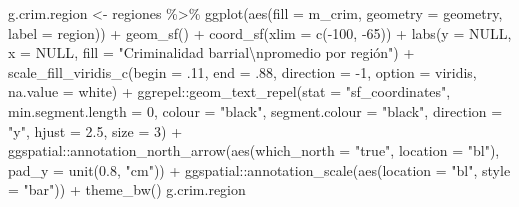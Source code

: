 \documentclass[
  12pt,
]{book}
\newenvironment{Shaded}{\begin{snugshade}}{\end{snugshade}}
\newcommand{\AttributeTok}[1]{\textcolor[rgb]{0.77,0.63,0.00}{#1}}
\newcommand{\ConstantTok}[1]{\textcolor[rgb]{0.00,0.00,0.00}{#1}}
\newcommand{\DecValTok}[1]{\textcolor[rgb]{0.00,0.00,0.81}{#1}}
\newcommand{\FloatTok}[1]{\textcolor[rgb]{0.00,0.00,0.81}{#1}}
\newcommand{\FunctionTok}[1]{\textcolor[rgb]{0.00,0.00,0.00}{#1}}
\newcommand{\NormalTok}[1]{#1}
\newcommand{\OtherTok}[1]{\textcolor[rgb]{0.56,0.35,0.01}{#1}}
\newcommand{\SpecialCharTok}[1]{\textcolor[rgb]{0.00,0.00,0.00}{#1}}
\newcommand{\StringTok}[1]{\textcolor[rgb]{0.31,0.60,0.02}{#1}}
\begin{document}
\begin{Shaded}
\begin{Highlighting}[]
\NormalTok{g.crim.region }\OtherTok{\textless{}{-}}\NormalTok{ regiones }\SpecialCharTok{\%\textgreater{}\%} 
  \FunctionTok{ggplot}\NormalTok{(}\FunctionTok{aes}\NormalTok{(}\AttributeTok{fill =}\NormalTok{ m\_crim, }\AttributeTok{geometry =}\NormalTok{ geometry, }\AttributeTok{label =}\NormalTok{ region)) }\SpecialCharTok{+} 
  \FunctionTok{geom\_sf}\NormalTok{() }\SpecialCharTok{+}
  \FunctionTok{coord\_sf}\NormalTok{(}\AttributeTok{xlim =} \FunctionTok{c}\NormalTok{(}\SpecialCharTok{{-}}\DecValTok{100}\NormalTok{, }\SpecialCharTok{{-}}\DecValTok{65}\NormalTok{)) }\SpecialCharTok{+}
  \FunctionTok{labs}\NormalTok{(}\AttributeTok{y =} \ConstantTok{NULL}\NormalTok{, }\AttributeTok{x =} \ConstantTok{NULL}\NormalTok{, }\AttributeTok{fill =} \StringTok{"Criminalidad barrial}\SpecialCharTok{\textbackslash{}n}\StringTok{promedio por región"}\NormalTok{) }\SpecialCharTok{+}
  \FunctionTok{scale\_fill\_viridis\_c}\NormalTok{(}\AttributeTok{begin =}\NormalTok{ .}\DecValTok{11}\NormalTok{, }\AttributeTok{end =}\NormalTok{ .}\DecValTok{88}\NormalTok{, }\AttributeTok{direction =} \SpecialCharTok{{-}}\DecValTok{1}\NormalTok{, }\AttributeTok{option =} \StringTok{\textquotesingle{}viridis\textquotesingle{}}\NormalTok{, }\AttributeTok{na.value =} \StringTok{\textquotesingle{}white\textquotesingle{}}\NormalTok{) }\SpecialCharTok{+}
\NormalTok{  ggrepel}\SpecialCharTok{::}\FunctionTok{geom\_text\_repel}\NormalTok{(}\AttributeTok{stat =} \StringTok{"sf\_coordinates"}\NormalTok{, }\AttributeTok{min.segment.length =} \DecValTok{0}\NormalTok{,}
                           \AttributeTok{colour =} \StringTok{"black"}\NormalTok{, }\AttributeTok{segment.colour =} \StringTok{"black"}\NormalTok{,}
                           \AttributeTok{direction =} \StringTok{"y"}\NormalTok{, }\AttributeTok{hjust =} \FloatTok{2.5}\NormalTok{, }\AttributeTok{size =} \DecValTok{3}\NormalTok{) }\SpecialCharTok{+}
\NormalTok{  ggspatial}\SpecialCharTok{::}\FunctionTok{annotation\_north\_arrow}\NormalTok{(}\FunctionTok{aes}\NormalTok{(}\AttributeTok{which\_north =} \StringTok{"true"}\NormalTok{, }\AttributeTok{location =} \StringTok{"bl"}\NormalTok{), }\AttributeTok{pad\_y =} \FunctionTok{unit}\NormalTok{(}\FloatTok{0.8}\NormalTok{, }\StringTok{"cm"}\NormalTok{)) }\SpecialCharTok{+}
\NormalTok{  ggspatial}\SpecialCharTok{::}\FunctionTok{annotation\_scale}\NormalTok{(}\FunctionTok{aes}\NormalTok{(}\AttributeTok{location =} \StringTok{"bl"}\NormalTok{, }\AttributeTok{style =} \StringTok{"bar"}\NormalTok{)) }\SpecialCharTok{+}
  \FunctionTok{theme\_bw}\NormalTok{()}
\NormalTok{g.crim.region}
\end{Highlighting}
\end{Shaded}
\end{document}
